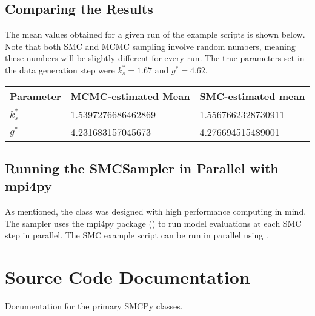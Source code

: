 \documentclass[letterpaper,10pt,english]{sphinxmanual}
\begin{document}
\begin{figure}[htbp]
\centering

\noindent{}
\end{figure}


\section{Comparing the Results}
\label{\detokenize{example:comparing-the-results}}
The mean values obtained for a given run of the example scripts is shown below.
Note that both SMC and MCMC sampling involve random numbers, meaning these
numbers will be slightly different for every run. The true parameters set in the data generation step were \(k_s^* = 1.67\) and \(g^* = 4.62\).


\begin{savenotes}\sphinxattablestart
\centering
\begin{tabulary}{\linewidth}[t]{|T|T|T|}
\hline
\sphinxstyletheadfamily 
Parameter
&\sphinxstyletheadfamily 
MCMC-estimated Mean
&\sphinxstyletheadfamily 
SMC-estimated mean
\\
\hline
\(k_s^*\)
&
1.5397276686462869
&
1.5567662328730911
\\
\hline
\(g^*\)
&
4.231683157045673
&
4.276694515489001
\\
\hline
\end{tabulary}
\par
\sphinxattableend\end{savenotes}


\section{Running the SMCSampler in Parallel with mpi4py}
\label{\detokenize{example:running-the-smcsampler-in-parallel-with-mpi4py}}
As mentioned, the  class was designed with high performance computing in mind. The sampler uses the mpi4py package () to run model evaluations at each SMC step in parallel. The SMC example script can be run in parallel using .


\chapter{Source Code Documentation}
\label{\detokenize{source_code:source-code-documentation}}\label{\detokenize{source_code:sourcecode-section}}\label{\detokenize{source_code::doc}}
Documentation for the primary SMCPy classes.
\end{document}
